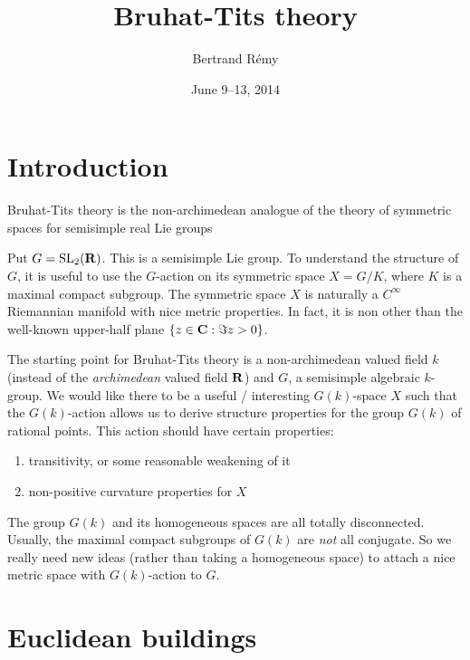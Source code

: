 \documentclass{article}
\title{Bruhat-Tits theory}
\author{Bertrand R\'emy}
\date{June 9--13, 2014}
\begin{document}
\maketitle
\tableofcontents





\section*{Introduction}

Bruhat-Tits theory is the non-archimedean analogue of the theory of symmetric 
spaces for semisimple real Lie groups 

\begin{example}
Put $G=\operatorname{SL}_2(\mathbf{R})$. This is a semisimple Lie group. To understand the 
structure of $G$, it is useful to use the $G$-action on its symmetric space 
$X=G/K$, where $K$ is a maximal compact subgroup. The symmetric space $X$ is 
naturally a $C^\infty$ Riemannian manifold with nice metric properties. In 
fact, it is non other than the well-known upper-half plane 
$\{z\in \mathbf{C}:\Im z>0\}$. 
\end{example}

The starting point for Bruhat-Tits theory is a non-archimedean valued field $k$ 
(instead of the \emph{archimedean} valued field $\mathbf{R}$) and $G$, a semisimple 
algebraic $k$-group. We would like there to be a useful / interesting 
$G(k)$-space $X$ such that the $G(k)$-action allows us to derive structure 
properties for the group $G(k)$ of rational points. This action should have 
certain properties:
\begin{enumerate}
  \item transitivity, or some reasonable weakening of it 
  \item non-positive curvature properties for $X$
\end{enumerate}

The group $G(k)$ and its homogeneous spaces are all totally disconnected. 
Usually, the maximal compact subgroups of $G(k)$ are \emph{not} all conjugate. 
So we really need new ideas (rather than taking a homogeneous space) to attach 
a nice metric space with $G(k)$-action to $G$. 





\section{Euclidean buildings}
\end{document}
